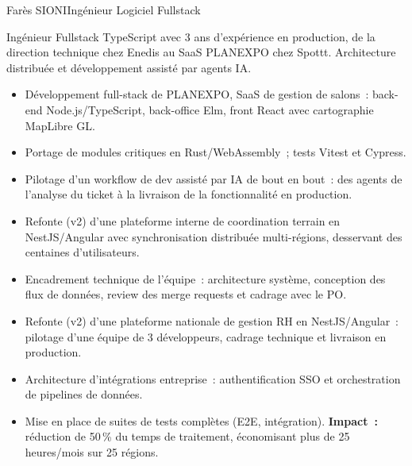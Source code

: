 \documentclass[letterpaper,11pt]{article}
\begin{document}
\begin{cv}[profile][2]
{Far\`es SIONI}{Ing\'enieur Logiciel Fullstack}

    Ing\'enieur Fullstack TypeScript avec 3 ans d'exp\'erience en production, de la direction technique chez Enedis au SaaS PLANEXPO chez Spottt.
    Architecture distribu\'ee et d\'eveloppement assist\'e par agents IA.

    \begin{cvevent}[06/2026][Auj.]
        \begin{itemize}
            \item D\'eveloppement full-stack de PLANEXPO, SaaS de gestion de salons~: back-end Node.js/TypeScript, back-office Elm, front React avec cartographie MapLibre GL.
            \item Portage de modules critiques en Rust/WebAssembly~; tests Vitest et Cypress.
            \item Pilotage d'un workflow de dev assist\'e par IA de bout en bout~: des agents de l'analyse du ticket \`a la livraison de la fonctionnalit\'e en production.
        \end{itemize}
    \end{cvevent}

\cvseparator[1]
    \begin{cvevent}[09/2025][04/2026]
        \begin{itemize}
            \item Refonte (v2) d'une plateforme interne de coordination terrain en NestJS/Angular avec synchronisation distribu\'ee multi-r\'egions, desservant des centaines d'utilisateurs.
            \item Encadrement technique de l'\'equipe~: architecture syst\`eme, conception des flux de donn\'ees, review des merge requests et cadrage avec le PO.
        \end{itemize}
    \end{cvevent}

\cvseparator[1]
    \begin{cvevent}[08/2023][08/2025]
        \begin{itemize}
            \item Refonte (v2) d'une plateforme nationale de gestion RH en NestJS/Angular~: pilotage d'une \'equipe de 3 d\'eveloppeurs, cadrage technique et livraison en production.
            \item Architecture d'int\'egrations entreprise~: authentification SSO et orchestration de pipelines de donn\'ees.
            \item Mise en place de suites de tests compl\`etes (E2E, int\'egration). \textbf{Impact~:} r\'eduction de 50\,\% du temps de traitement, \'economisant plus de 25 heures/mois sur 25 r\'egions.
        \end{itemize}
    \end{cvevent}


\end{cv}
\end{document}
